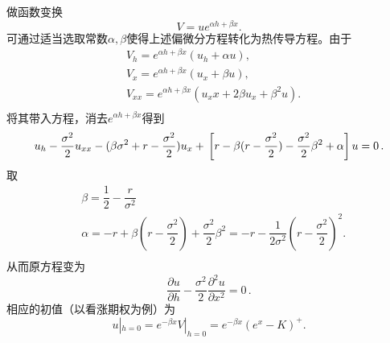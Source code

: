 \documentclass[oneside]{sysuthesis}
\begin{document}
做函数变换
\begin{equation*}
	V=ue^{\alpha h+\beta x}.
\end{equation*}
可通过适当选取常数$\alpha,\beta$使得上述偏微分方程转化为热传导方程。由于
\begin{equation*}
	\begin{split}
		&V_h=e^{\alpha h+\beta x}(u_h+\alpha u),\\
		&V_x=e^{\alpha h+\beta x}(u_x+\beta u),\\
		&V_{xx}=e^{\alpha h+\beta x}(u_xx+2\beta u_x+\beta^2 u).\\
	\end{split}
\end{equation*}
将其带入方程，消去$e^{\alpha h+\beta x}$得到
\begin{equation*}
	u_h-\dfrac{\sigma^2}{2}u_{xx}-(\beta\sigma^2+r-\frac{\sigma^2}{2})u_x+\\\left[r-\beta(r-\dfrac{\sigma^2}{2})-\dfrac{\sigma^2}{2}\beta^2+\alpha\right]u=0\,.
\end{equation*}
取
\begin{equation}\label{equa:4.5}
	\begin{split}
		&\beta=\dfrac{1}{2}-\dfrac{r}{\sigma^2}\\
		&\alpha=-r+\beta(r-\dfrac{\sigma^2}{2})+\dfrac{\sigma^2}{2}\beta^2=-r-\dfrac{1}{2\sigma^2}(r-\dfrac{\sigma^2}{2})^2.\\
	\end{split}
\end{equation}
从而原方程变为
\begin{equation*}
	\dfrac{\partial u}{\partial h}-\dfrac{\sigma^2}{2}\dfrac{\partial^2 u}{\partial x^2}=0\,.
\end{equation*}
相应的初值（以看涨期权为例）为
\begin{equation*}
	u|_{h=0}=e^{-\beta x}V|_{h=0}=e^{-\beta x}(e^x-K)^+.
\end{equation*}
\end{document}
